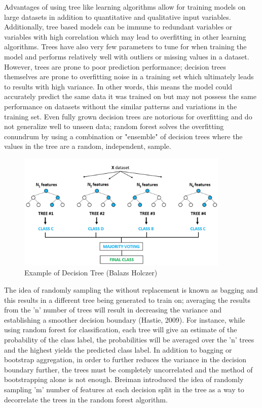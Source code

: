 \documentclass{llncs}
\begin{document}
Advantages of using tree like learning algorithms allow for training models on large datasets in addition to quantitative and qualitative input variables. Additionally, tree based models can be immune to redundant variables or variables with high correlation which may lead to overfitting in other learning algorithms. Trees have also very few parameters to tune for when training the model and performs relatively well with outliers or missing values in a dataset. However, trees are prone to poor prediction performance; decision trees themselves are prone to overfitting noise in a training set which ultimately leads to results with high variance. In other words, this means the model could accurately predict the same data it was trained on but may not possess the same performance on datasets without the similar patterns and variations in the training set. Even fully grown decision trees are notorious for overfitting and do not generalize well to unseen data; random forest solves the overfitting conundrum by using a combination or "ensemble" of decision trees where the values in the tree are a random, independent, sample. 


\begin{figure}
\centering
\includegraphics[width=0.90\textwidth]{randomforest.png}
\caption{Example of Decision Tree (Balazs Holczer)}
\end{figure}


The idea of randomly sampling the without replacement is known as bagging and this results in a different tree being generated to train on; averaging the results from the 'n' number of trees will result in decreasing the variance and establishing a smoother decision boundary (Hastie, 2009). For instance, while using random forest for classification, each tree will give an estimate of the probability of the class label, the probabilities will be averaged over the 'n' trees and the highest yields the predicted class label. In addition to bagging or bootstrap aggregation, in order to further reduces the variance in the decision boundary further, the trees must be completely uncorrelated and the method of bootstrapping alone is not enough. Breiman introduced the idea of randomly sampling 'm' number of features at each decision split in the tree as a way to decorrelate the trees in the random forest algorithm.  
\end{document}
